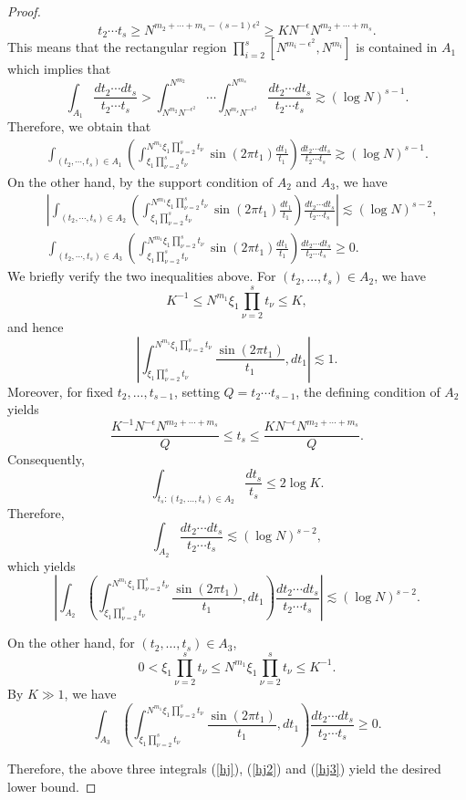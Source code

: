 \documentclass[10pt,a4paper]{amsart}
\numberwithin{equation}{section}
\begin{document}
\begin{proof}
$$t_2\cdots t_s
\ge N^{m_2+\cdots+m_s-(s-1)\epsilon^2}
\ge K N^{-\epsilon}N^{m_2+\cdots+m_s}.$$ This means that  the rectangular region
$
\prod_{i=2}^{s}[N^{m_i-\epsilon^2},N^{m_i}]
$
is contained in $A_1$ which implies that  $$\int_{A_1}\frac{d t_2\cdots dt_s}{t_2\cdots t_s}> \int_{N^{m_2}N^{-\epsilon^2}}^{N^{m_2}}\cdots\int_{N^{m_s}N^{-\epsilon^2}}^{N^{m_s}}  \frac{dt_2\cdots dt_s}{t_2\cdots t_s}  \gtrsim (\log N)^{s-1}.$$ Therefore, we obtain that
\begin{align}\label{hj}
	 \int_{(t_2,\cdots,t_s)\in A_1}   \left( \int_{\xi_1 \prod_{\nu=2}^s t_\nu  }^{N^{m_1}\xi_1 \prod_{\nu=2}^s t_\nu }\sin(2\pi t_1 ) \frac{dt_1}{t_1}\right) \frac{dt_2\cdots dt_s}{t_2\cdots t_s}\gtrsim (\log N)^{s-1}.
\end{align}
On the other hand, by the support condition of $A_2$ and $A_3$, we have
\begin{align}
&\left| \int_{(t_2,\cdots,t_s)\in A_2}   \left( \int_{\xi_1 \prod_{\nu=2}^s t_\nu  }^{N^{m_1}\xi_1 \prod_{\nu=2}^s t_\nu }\sin(2\pi t_1 ) \frac{dt_1}{t_1}\right) \frac{dt_2\cdots dt_s}{t_2\cdots t_s}\right|\lesssim (\log N)^{s-2},\label{hj2}\\
& \int_{(t_2,\cdots,t_s)\in A_3}   \left( \int_{\xi_1 \prod_{\nu=2}^s t_\nu  }^{N^{m_1}\xi_1 \prod_{\nu=2}^s t_\nu }\sin(2\pi t_1 ) \frac{dt_1}{t_1}\right) \frac{dt_2\cdots dt_s}{t_2\cdots t_s}\ge 0.\label{hj3}
\end{align}
We briefly verify the two inequalities above. For $(t_2,\dots,t_s)\in A_2$, we have
$$
K^{-1}\le N^{m_1}\xi_1\prod_{\nu=2}^s t_\nu\le K,
$$
and hence
$$
\left|
\int_{\xi_1\prod_{\nu=2}^s t_\nu}^{N^{m_1}\xi_1\prod_{\nu=2}^s t_\nu}
\frac{\sin(2\pi t_1)}{t_1},dt_1
\right|
\lesssim 1.
$$
Moreover, for fixed $t_2,\dots,t_{s-1}$, setting $Q=t_2\cdots t_{s-1}$, the defining condition of $A_2$ yields
$$
\frac{K^{-1}N^{-\epsilon}N^{m_2+\cdots+m_s}}{Q}
\le t_s\le
\frac{KN^{-\epsilon}N^{m_2+\cdots+m_s}}{Q}.
$$
Consequently,
$$
\int_{{t_s:(t_2,\dots,t_s)\in A_2}}\frac{dt_s}{t_s}
\le 2\log K.
$$ Therefore,
$$
\int_{A_2}\frac{dt_2\cdots dt_s}{t_2\cdots t_s}
\lesssim (\log N)^{s-2},
$$
which yields
$$
\left|
\int_{A_2}
\left(
\int_{\xi_1\prod_{\nu=2}^s t_\nu}^{N^{m_1}\xi_1\prod_{\nu=2}^s t_\nu}
\frac{\sin(2\pi t_1)}{t_1},dt_1
\right)
\frac{dt_2\cdots dt_s}{t_2\cdots t_s}
\right|
\lesssim (\log N)^{s-2}.
$$

On the other hand, for $(t_2,\dots,t_s)\in A_3$,
$$
0<
\xi_1\prod_{\nu=2}^s t_\nu
\le
N^{m_1}\xi_1\prod_{\nu=2}^s t_\nu
\le K^{-1}.
$$
By $K\gg 1$, we have 
$$
\int_{A_3}
\left(
\int_{\xi_1\prod_{\nu=2}^s t_\nu}^{N^{m_1}\xi_1\prod_{\nu=2}^s t_\nu}
\frac{\sin(2\pi t_1)}{t_1},dt_1
\right)
\frac{dt_2\cdots dt_s}{t_2\cdots t_s}
\ge0.
$$




Therefore, the above three integrals (\ref{hj}), (\ref{hj2}) and (\ref{hj3}) yield the desired lower bound.
\end{proof}
\end{document}
